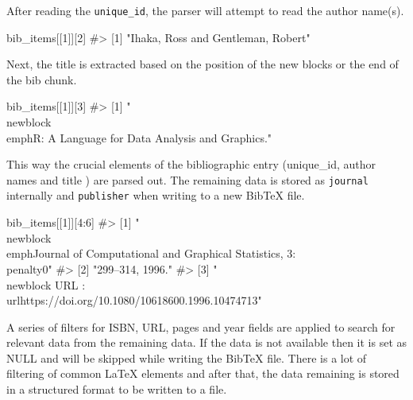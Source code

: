 After reading the \verb|unique_id|, the parser will attempt to read the author name(s).

\begin{Sinput}
bib_items[[1]][2]
#> [1] "Ihaka, Ross and Gentleman, Robert"
\end{Sinput}

Next, the title is extracted based on the position of the new blocks or the end of the bib chunk. 

\begin{Sinput}
bib_items[[1]][3]
#> [1] "\\newblock \\emph{R: A Language for Data Analysis and Graphics.}"
\end{Sinput}

This way the crucial elements of the bibliographic entry (unique\_id, author names and title ) are parsed out.
The remaining data is stored as \verb|journal| internally and \verb|publisher| when writing to a new BibTeX file.

\begin{Sinput}
bib_items[[1]][4:6]
#> [1] "\\newblock \\emph{Journal of Computational and Graphical Statistics}, 3:\\penalty0"
#> [2] "299--314, 1996."                                                                   
#> [3] "\\newblock URL : \\url{https://doi.org/10.1080/10618600.1996.10474713}"
\end{Sinput}


A series of filters for ISBN, URL, pages and year fields are applied to search for relevant data from the remaining data. If the data is not available then it is set as NULL and will be skipped while writing the BibTeX file. 
There is a lot of filtering of common LaTeX elements and after that, the data remaining is stored in a structured format to be written to a file. 


\begin{Schunk}
\end{Schunk}


